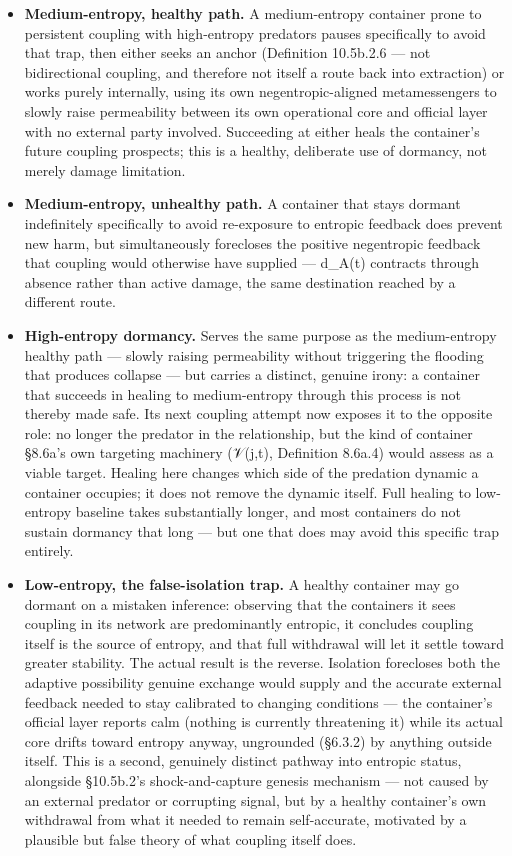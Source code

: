 \documentclass[
]{article}
\begin{document}
\begin{itemize}
\item
  \textbf{Medium-entropy, healthy path.} A medium-entropy container
  prone to persistent coupling with high-entropy predators pauses
  specifically to avoid that trap, then either seeks an anchor
  (Definition 10.5b.2.6 --- not bidirectional coupling, and therefore
  not itself a route back into extraction) or works purely internally,
  using its own negentropic-aligned metamessengers to slowly raise
  permeability between its own operational core and official layer with
  no external party involved. Succeeding at either heals the container's
  future coupling prospects; this is a healthy, deliberate use of
  dormancy, not merely damage limitation.
\item
  \textbf{Medium-entropy, unhealthy path.} A container that stays
  dormant indefinitely specifically to avoid re-exposure to entropic
  feedback does prevent new harm, but simultaneously forecloses the
  positive negentropic feedback that coupling would otherwise have
  supplied --- d\_A(t) contracts through absence rather than active
  damage, the same destination reached by a different route.
\item
  \textbf{High-entropy dormancy.} Serves the same purpose as the
  medium-entropy healthy path --- slowly raising permeability without
  triggering the flooding that produces collapse --- but carries a
  distinct, genuine irony: a container that succeeds in healing to
  medium-entropy through this process is not thereby made safe. Its next
  coupling attempt now exposes it to the opposite role: no longer the
  predator in the relationship, but the kind of container §8.6a's own
  targeting machinery (𝒱(j,t), Definition 8.6a.4) would assess as a
  viable target. Healing here changes which side of the predation
  dynamic a container occupies; it does not remove the dynamic itself.
  Full healing to low-entropy baseline takes substantially longer, and
  most containers do not sustain dormancy that long --- but one that
  does may avoid this specific trap entirely.
\item
  \textbf{Low-entropy, the false-isolation trap.} A healthy container
  may go dormant on a mistaken inference: observing that the containers
  it sees coupling in its network are predominantly entropic, it
  concludes coupling itself is the source of entropy, and that full
  withdrawal will let it settle toward greater stability. The actual
  result is the reverse. Isolation forecloses both the adaptive
  possibility genuine exchange would supply and the accurate external
  feedback needed to stay calibrated to changing conditions --- the
  container's official layer reports calm (nothing is currently
  threatening it) while its actual core drifts toward entropy anyway,
  ungrounded (§6.3.2) by anything outside itself. This is a second,
  genuinely distinct pathway into entropic status, alongside §10.5b.2's
  shock-and-capture genesis mechanism --- not caused by an external
  predator or corrupting signal, but by a healthy container's own
  withdrawal from what it needed to remain self-accurate, motivated by a
  plausible but false theory of what coupling itself does.
\end{itemize}
\end{document}
